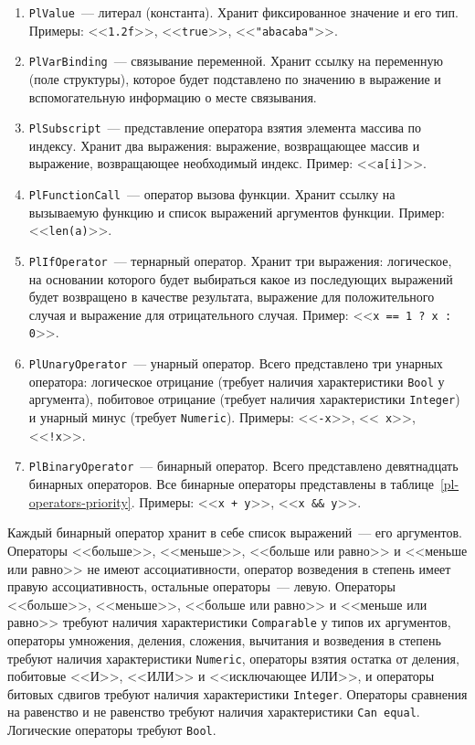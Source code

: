 \documentclass[times,specification,annotation]{style/itmo-student-thesis/itmo-student-thesis}
\begin{document}
\begin{enumerate}[leftmargin=1.75cm]
    \item \texttt{PlValue}~--- литерал (константа). Хранит фиксированное значение и его тип. Примеры: <<\texttt{1.2f}>>, <<\texttt{true}>>, <<\texttt{"abacaba"}>>.
    \item \texttt{PlVarBinding}~--- связывание переменной. Хранит ссылку на переменную (поле структуры), которое будет подставлено по значению в выражение и вспомогательную информацию о месте связывания.
    \item \texttt{PlSubscript}~--- представление оператора взятия элемента массива по индексу. Хранит два выражения: выражение, возвращающее массив и выражение, возвращающее необходимый индекс. Пример: <<\texttt{a[i]}>>.
    \item \texttt{PlFunctionCall}~--- оператор вызова функции. Хранит ссылку на вызываемую функцию и список выражений аргументов функции. Пример: <<\texttt{len(a)}>>.
    \item \texttt{PlIfOperator}~--- тернарный оператор. Хранит три выражения: логическое, на основании которого будет выбираться какое из последующих выражений будет возвращено в качестве результата, выражение для положительного случая и выражение для отрицательного случая. Пример: <<\texttt{x == 1 ? x : 0}>>.
    \item \texttt{PlUnaryOperator}~--- унарный оператор. Всего представлено три унарных оператора: логическое отрицание (требует наличия характеристики \texttt{Bool} у аргумента), побитовое отрицание (требует наличия характеристики \texttt{Integer}) и унарный минус (требует \texttt{Numeric}). Примеры: <<\texttt{-x}>>, <<\texttt{~x}>>, <<\texttt{!x}>>.
    \item \texttt{PlBinaryOperator}~--- бинарный оператор. Всего представлено девятнадцать бинарных операторов. Все бинарные операторы представлены в таблице~\ref{pl-operators-priority}. Примеры: <<\texttt{x + y}>>, <<\texttt{x \&\& y}>>.
\end{enumerate}

Каждый бинарный оператор хранит в себе список выражений~--- его аргументов. Операторы <<больше>>, <<меньше>>, <<больше или равно>> и <<меньше или равно>> не имеют ассоциативности, оператор возведения в степень имеет правую ассоциативность, остальные операторы~--- левую. Операторы <<больше>>, <<меньше>>, <<больше или равно>> и <<меньше или равно>> требуют наличия характеристики \texttt{Comparable} у типов их аргументов, операторы умножения, деления, сложения, вычитания и возведения в степень требуют наличия характеристики \texttt{Numeric}, операторы взятия остатка от деления, побитовые <<И>>, <<ИЛИ>> и <<исключающее ИЛИ>>, и операторы битовых сдвигов требуют наличия характеристики \texttt{Integer}. Операторы сравнения на равенство и не равенство требуют наличия характеристики \texttt{Can equal}. Логические операторы требуют \texttt{Bool}.
\end{document}
